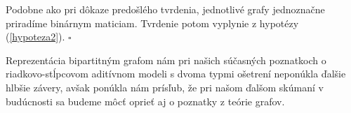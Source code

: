 \begin{dokaz}
Podobne ako pri dôkaze predošlého tvrdenia, jednotlivé grafy jednoznačne priradíme binárnym maticiam. Tvrdenie potom vyplynie z hypotézy (\ref{hypoteza2}). $\square$
\end{dokaz}

Reprezentácia bipartitným grafom nám pri našich súčasných poznatkoch o riadkovo-stĺpcovom aditívnom modeli s dvoma typmi ošetrení neponúkla ďalšie hlbšie závery, 
avšak ponúkla nám prísľub, že pri našom ďalšom skúmaní v budúcnosti sa budeme môcť oprieť aj o poznatky z teórie grafov.